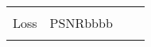 \begin{tabular}{c c c c c c c c}
	\\ \\
	
	
	
	\multicolumn{2}{c}{Loss}  &  \multicolumn{4}{c}{PSNR{\color{white}bbbb}}
	
	\\
	
	\multicolumn{2}{c}{}
	&
	\multicolumn{4}{c}{}
\end{tabular}